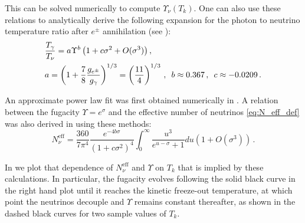 This can be solved numerically to compute $\Upsilon_\nu(T_k)$. One can also use these relations to analytically derive the following expansion for the photon to neutrino temperature ratio after $e^\pm$ annihilation (see \cite{Birrell:2012gg}):
\begin{align}\label{Upsilon_ratio}
&\frac{T_\gamma}{T_\nu}=a\Upsilon^{b}\left(1+c\sigma^2+O(\sigma^3)\right),\\
\label{value_a}
&a=\left(1+\frac{7}{8}\frac{g_{e^\pm}}{g_\gamma}\right)^{1/3}=\left(\frac{11}{4}\right)^{1/3}\,,\,\,\,b\approx 0.367\,, \,\,\,c\approx -0.0209\,.\notag
\end{align}

An approximate power law fit was first obtained numerically in \cite{Birrell:2013gpa}. A relation between   the fugacity $\Upsilon=e^\sigma$ and the effective number of neutrinos \eqref{eq:N_eff_def} was also derived in \cite{Birrell:2012gg} using these methods:
\begin{equation}\label{N_nu_approx}
N^{\mathrm{eff}}_\nu=\frac{360}{7\pi^4}\frac{e^{-4b\sigma}}{(1+c\sigma^2)^4}\int_0^\infty \frac{u^3}{e^{u-\sigma}+1}du\left(1+O(\sigma^3)\right)\,.
\end{equation}

 In  we plot that dependence of $N^{\mathrm{eff}}_\nu$ and $\Upsilon$  on $T_k$ that is implied by these calculations.  In particular, the fugacity evolves following the solid black curve in the right hand plot until it reaches the kinetic freeze-out temperature, at which point the neutrinos decouple and $\Upsilon$ remains constant thereafter, as shown in the dashed black curves for two sample values of $T_k$. 
 
